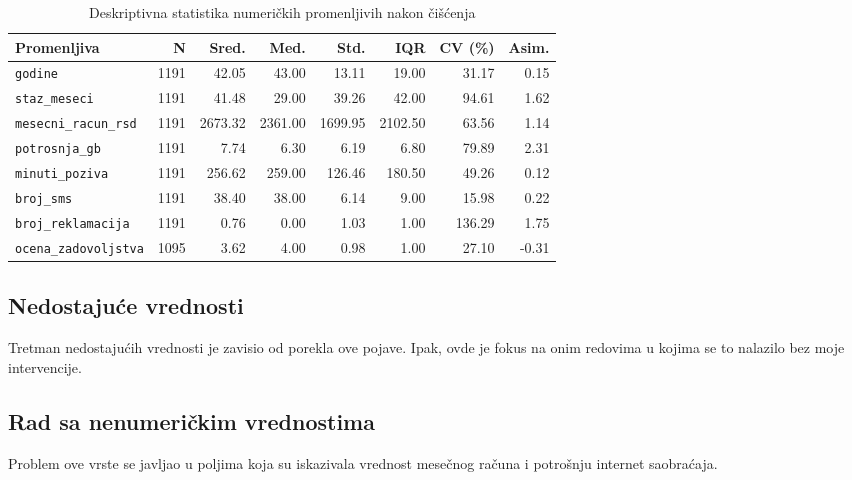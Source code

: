 \documentclass[a4paper,12pt]{article}
\begin{document}
    \begin{table}[htbp]
    \centering
    \caption{Deskriptivna statistika numeričkih promenljivih nakon čišćenja}
    \label{tab:mere-posle}
    \small
    \begin{tabular}{lrrrrrrr}
    \toprule
    \textbf{Promenljiva} &
    \textbf{N} &
    \textbf{Sred.} &
    \textbf{Med.} &
    \textbf{Std.} &
    \textbf{IQR} &
    \textbf{CV (\%)} &
    \textbf{Asim.} \\
    \midrule

    \texttt{godine}
    & 1191 & 42.05 & 43.00 & 13.11 & 19.00 & 31.17 & 0.15 \\

    \texttt{staz\_meseci}
    & 1191 & 41.48 & 29.00 & 39.26 & 42.00 & 94.61 & 1.62 \\

    \texttt{mesecni\_racun\_rsd}
    & 1191 & 2673.32 & 2361.00 & 1699.95 & 2102.50 & 63.56 & 1.14 \\

    \texttt{potrosnja\_gb}
    & 1191 & 7.74 & 6.30 & 6.19 & 6.80 & 79.89 & 2.31 \\

    \texttt{minuti\_poziva}
    & 1191 & 256.62 & 259.00 & 126.46 & 180.50 & 49.26 & 0.12 \\

    \texttt{broj\_sms}
    & 1191 & 38.40 & 38.00 & 6.14 & 9.00 & 15.98 & 0.22 \\

    \texttt{broj\_reklamacija}
    & 1191 & 0.76 & 0.00 & 1.03 & 1.00 & 136.29 & 1.75 \\

    \texttt{ocena\_zadovoljstva}
    & 1095 & 3.62 & 4.00 & 0.98 & 1.00 & 27.10 & -0.31 \\

    \bottomrule
    \end{tabular}
    \end{table}


    
    \subsection*{Nedostajuće vrednosti}
    Tretman nedostajućih vrednosti je zavisio od porekla ove pojave. Ipak, ovde je fokus na onim redovima
    u kojima se to nalazilo bez moje intervencije.

    \subsection*{Rad sa nenumeričkim vrednostima}
    Problem ove vrste se javljao u poljima koja su iskazivala vrednost mesečnog računa i potrošnju internet saobraćaja.
\end{document}
